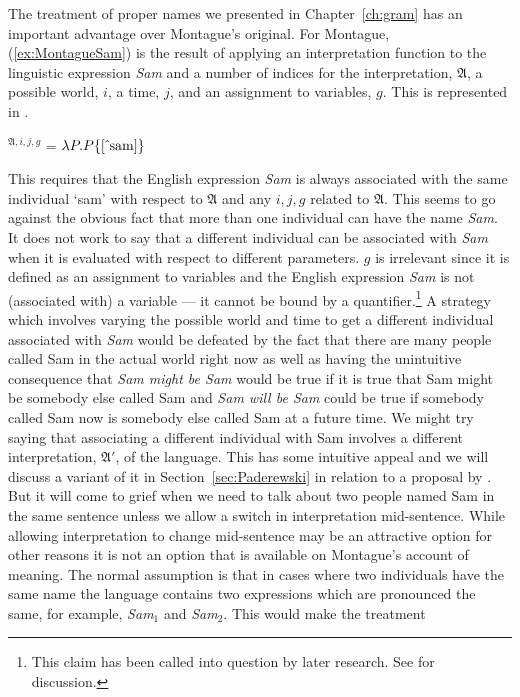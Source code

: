 The treatment of proper names we presented in Chapter~\ref{ch:gram}
has an important advantage over
Montague's original.  For Montague, (\ref{ex:MontagueSam}) is the
result of applying an interpretation function to the linguistic
expression \textit{Sam} and a number of indices for the
interpretation, $\mathfrak{A}$, a possible world, $i$, a time, $j$,
and an assignment to variables, $g$.  This is represented in
\nexteg{}.
\begin{ex} 
$^{\mathfrak{A},i,j,g}$ = $\lambda P.P\{[\,\hat{}\,\mathrm{sam}]\}$ 
\end{ex} 
This requires that the English expression \textit{Sam} is always
associated with the same individual `sam' with respect to
$\mathfrak{A}$ and any $i,j,g$ related to $\mathfrak{A}$.  This seems to go against the obvious fact that
more than one individual can have the name \textit{Sam}.  It does not
work to say that a different individual can be associated with
\textit{Sam} when it is evaluated with respect to different
parameters.  $g$ is irrelevant since it is defined as an assignment to
variables and the English expression \textit{Sam} is not (associated
with) a variable --- it cannot be bound by a quantifier.\footnote{This
  claim has been called into question by later research.  See
  \cite{Maier2009} for discussion.}  A strategy
which involves varying the
possible world and time to get a different individual associated with
\textit{Sam} would be defeated by the fact that there are many people
called Sam in the actual world right now as well as having the
unintuitive consequence that \textit{Sam might be Sam} would be true if it is true
that Sam might be somebody else called Sam and \textit{Sam will be
  Sam} could be true if somebody called Sam now is somebody else
called Sam at a future time.  We might try saying that associating a
different individual with Sam involves a different interpretation,
$\mathfrak{A}'$, of the language.  This has some intuitive appeal and
we will discuss a variant of it in Section~\ref{sec:Paderewski} in
relation to a proposal by \cite{Ludlow2014}. But
it will come to grief when we need to talk about two people named Sam
in the same sentence unless we allow a switch in interpretation
mid-sentence.  While allowing interpretation to change mid-sentence
may be an attractive option for other reasons it is not an option that
is available on Montague's account of meaning.  The normal assumption
is that in cases where two individuals have the same name the language
contains two expressions which are pronounced the same, for example,
\textit{Sam}$_1$ and \textit{Sam}$_2$.  This would make the treatment

